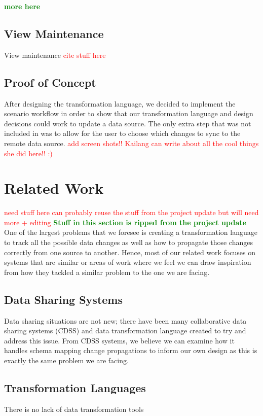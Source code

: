\documentclass[12pt]{article}
\begin{document}
\textbf{\textcolor{green}{more here}}

\subsection{View Maintenance}
View maintenance \textcolor{red}{cite stuff here}

\subsection{Proof of Concept}
After designing the transformation language, we decided to implement the scenario workflow in order to show that our transformation language and design decisions could work to update a data source. The only extra step that was not included in \cite{arniThesis} was to allow for the user to choose which changes to sync to the remote data source. \textcolor{red}{add screen shots!! Kailang can write about all the cool things she did here!! :)}

\section{Related Work}
\textcolor{red}{need stuff here can probably reuse the stuff from the project update but will need more + editing}
\textbf{\textcolor{green}{Stuff in this section is ripped from the project update}}
One of the largest problems that we foresee is creating a transformation language to track all the possible data changes as well as how to propagate those changes correctly from one source to another. Hence, most of our related work focuses on systems that are similar or areas of work where we feel we can draw inspiration from how they tackled a similar problem to the one we are facing.

\subsection{Data Sharing Systems}
Data sharing situations are not new; there have been many collaborative data sharing systems (CDSS) \cite{ives2008orchestra, ives2005orchestra, karvounarakis2013collaborative}and data transformation language \cite{kandel2011wrangler, lakshmanan2001schemasql} created to try and address this issue. From CDSS systems, we believe we can examine how it handles schema mapping change propagations to inform our own design as this is exactly the same problem we are facing. 

\subsection{Transformation Languages}
There is no lack of data transformation tools 
\end{document}
